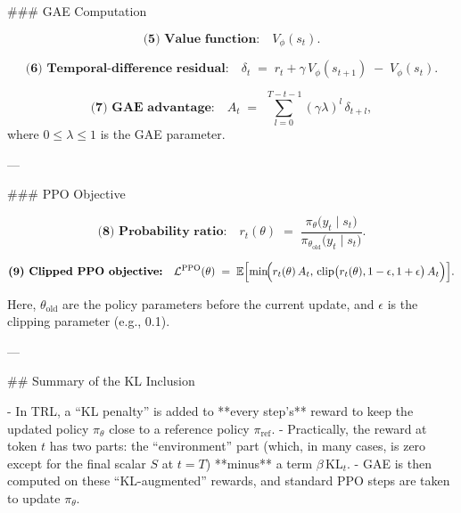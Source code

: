 ### GAE Computation

\[
\textbf{(5) Value function:} \quad 
V_\phi(s_t).
\]

\[
\textbf{(6) Temporal-difference residual:} \quad 
\delta_t \;=\; r_t + \gamma \, V_\phi(s_{t+1}) \;-\; V_\phi(s_t).
\]

\[
\textbf{(7) GAE advantage:} \quad 
A_t \;=\; \sum_{l=0}^{\,T-t-1} (\gamma \lambda)^l \,\delta_{t+l},
\]
where \(0 \le \lambda \le 1\) is the GAE parameter.

---

### PPO Objective

\[
\textbf{(8) Probability ratio:} \quad 
r_t(\theta) \;=\; \frac{\pi_\theta\bigl(y_t \mid s_t\bigr)}{\pi_{\theta_{\text{old}}}\bigl(y_t \mid s_t\bigr)}.
\]

\[
\textbf{(9) Clipped PPO objective:} \quad 
\mathcal{L}^{\text{PPO}}(\theta) 
\;=\; 
\mathbb{E}\Bigl[
\min\!\Bigl(
r_t(\theta)\,A_t,\,\text{clip}\bigl(r_t(\theta), 1-\epsilon, 1+\epsilon\bigr)\,A_t
\Bigr)
\Bigr].
\]

Here, \(\theta_{\text{old}}\) are the policy parameters before the current update, and \(\epsilon\) is the clipping parameter (e.g., 0.1).

---

## Summary of the KL Inclusion

- In TRL, a “KL penalty” is added to **every step’s** reward to keep the updated policy \(\pi_\theta\) close to a reference policy \(\pi_{\text{ref}}\).  
- Practically, the reward at token \(t\) has two parts: the “environment” part (which, in many cases, is zero except for the final scalar \(S\) at \(t=T\)) **minus** a term \(\beta \,\mathrm{KL}_t\).  
- GAE is then computed on these “KL-augmented” rewards, and standard PPO steps are taken to update \(\pi_\theta\).